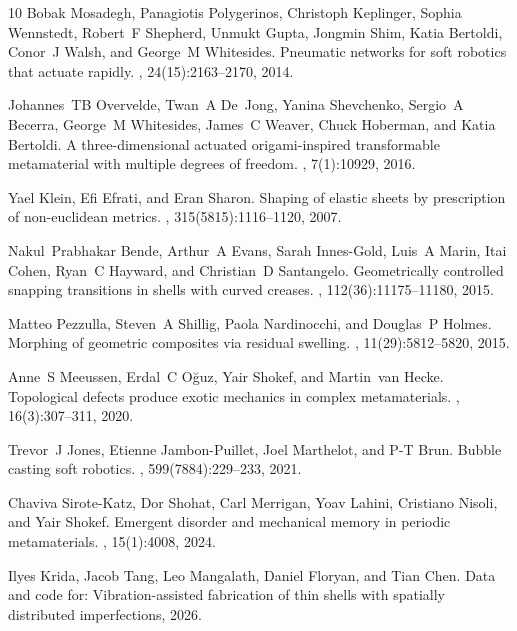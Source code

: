 \documentclass[twocolumn,letter,11pt]{article}
\begin{document}
\begin{thebibliography}{10}
Bobak Mosadegh, Panagiotis Polygerinos, Christoph Keplinger, Sophia Wennstedt,
  Robert~F Shepherd, Unmukt Gupta, Jongmin Shim, Katia Bertoldi, Conor~J Walsh,
  and George~M Whitesides.
\newblock Pneumatic networks for soft robotics that actuate rapidly.
, 24(15):2163--2170, 2014.

Johannes~TB Overvelde, Twan~A De~Jong, Yanina Shevchenko, Sergio~A Becerra,
  George~M Whitesides, James~C Weaver, Chuck Hoberman, and Katia Bertoldi.
\newblock A three-dimensional actuated origami-inspired transformable
  metamaterial with multiple degrees of freedom.
, 7(1):10929, 2016.

Yael Klein, Efi Efrati, and Eran Sharon.
\newblock Shaping of elastic sheets by prescription of non-euclidean metrics.
, 315(5815):1116--1120, 2007.

Nakul~Prabhakar Bende, Arthur~A Evans, Sarah Innes-Gold, Luis~A Marin, Itai
  Cohen, Ryan~C Hayward, and Christian~D Santangelo.
\newblock Geometrically controlled snapping transitions in shells with curved
  creases.
,
  112(36):11175--11180, 2015.

Matteo Pezzulla, Steven~A Shillig, Paola Nardinocchi, and Douglas~P Holmes.
\newblock Morphing of geometric composites via residual swelling.
, 11(29):5812--5820, 2015.

Anne~S Meeussen, Erdal~C O{\u{g}}uz, Yair Shokef, and Martin~van Hecke.
\newblock Topological defects produce exotic mechanics in complex
  metamaterials.
, 16(3):307--311, 2020.

Trevor~J Jones, Etienne Jambon-Puillet, Joel Marthelot, and P-T Brun.
\newblock Bubble casting soft robotics.
, 599(7884):229--233, 2021.

Chaviva Sirote-Katz, Dor Shohat, Carl Merrigan, Yoav Lahini, Cristiano Nisoli,
  and Yair Shokef.
\newblock Emergent disorder and mechanical memory in periodic metamaterials.
, 15(1):4008, 2024.

Ilyes Krida, Jacob Tang, Leo Mangalath, Daniel Floryan, and Tian Chen.
\newblock Data and code for: Vibration-assisted fabrication of thin shells with
  spatially distributed imperfections, 2026.

\end{thebibliography}
\end{document}
